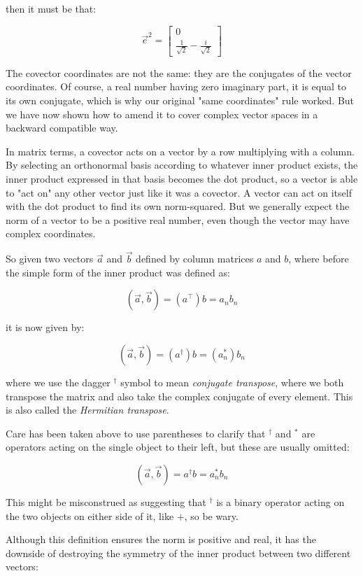 then it must be that:

$$
\vec{e}^2 = \begin{bmatrix}0 \\ \frac{1}{\sqrt{2}} - \frac{i}{\sqrt{2}}\end{bmatrix}
$$

The covector coordinates are not the same: they are the conjugates of the vector coordinates. Of course, a real number having zero imaginary part, it is equal to its own conjugate, which is why our original "same coordinates" rule worked. But we have now shown how to amend it to cover complex vector spaces in a backward compatible way.

In matrix terms, a covector acts on a vector by a row multiplying with a column. By selecting an orthonormal basis according to whatever inner product exists, the inner product expressed in that basis becomes the dot product, so a vector is able to "act on" any other vector just like it was a covector. A vector can act on itself with the dot product to find its own norm-squared. But we generally expect the norm of a vector to be a positive real number, even though the vector may have complex coordinates.

So given two vectors $\vec{a}$ and $\vec{b}$ defined by column matrices $a$ and $b$, where before the simple form of the inner product was defined as:

$$
(\vec{a}, \vec{b}) = (a^\intercal) b = a_n b_n
$$

it is now given by:

$$
(\vec{a}, \vec{b}) = (a^\dagger) b = (a_n^*) b_n
$$

where we use the dagger $^\dagger$ symbol to mean \textit{conjugate transpose}, where we both transpose the matrix and also take the complex conjugate of every element. This is also called the \textit{Hermitian transpose}.

Care has been taken above to use parentheses to clarify that $^\dagger$ and $^*$ are operators acting on the single object to their left, but these are usually omitted:

$$
(\vec{a}, \vec{b}) = a^\dagger b = a_n^* b_n
$$

This might be misconstrued as suggesting that $^\dagger$ is a binary operator acting on the two objects on either side of it, like $+$, so be wary.

Although this definition ensures the norm is positive and real, it has the downside of destroying the symmetry of the inner product between two different vectors:

